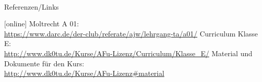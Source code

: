 \renewcommand{\refname}{Referenzen}

\hypertarget{refs}{}
\textcolor{white}{} \\ %
\Large Referenzen/Links
\footnotesize

\begin{thebibliography}{}
    [online]
   Moltrecht A 01: \\
    \url{https://www.darc.de/der-club/referate/ajw/lehrgang-ta/a01/}
    Curriculum Klasse E: \\
    \url{http://www.dk0tu.de/Kurse/AFu-Lizenz/Curriculum/Klasse_E/}
     Material und Dokumente für den Kurs: \\
    \url{http://www.dk0tu.de/Kurse/AFu-Lizenz#material}
\end{thebibliography}



